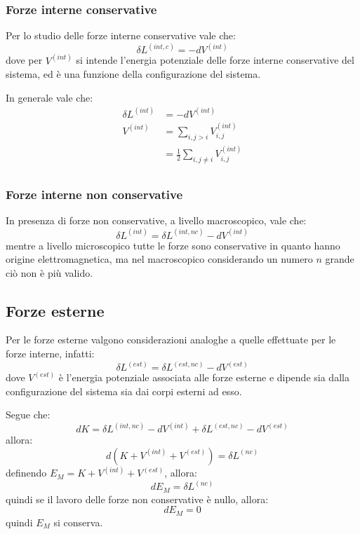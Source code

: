 \documentclass[11pt, a4paper, openright]{book}
\theoremstyle{plain}
\theoremstyle{definition}
\begin{document}
\subsubsection{Forze interne conservative}
Per lo studio delle forze interne conservative vale che:
\begin{equation}
    \delta L^{(int, c)} = -dV^{(int)}
\end{equation}
dove per $V^{(int)}$ si intende l'energia potenziale delle forze interne conservative del sistema, ed è una funzione della configurazione del sistema.

In generale vale che:
\begin{align}
    \delta L^{(int)} & = -dV^{(int)} \\
    V^{(int)} & = \sum_{i, j > i} V_{i, j}^{(int)} \\
              & = \frac{1}{2}\sum_{i, j \not = i} V_{i, j}^{(int)} \\
\end{align}

\subsubsection{Forze interne non conservative}
In presenza di forze non conservative, a livello macroscopico, vale che:
\begin{equation}
    \delta L^{(int)} = \delta L^{(int, nc)} -dV^{(int)} 
\end{equation}
mentre a livello microscopico tutte le forze sono conservative in quanto hanno origine elettromagnetica, ma nel macroscopico considerando un numero $n$ grande ciò non è più valido.

\subsection{Forze esterne}
Per le forze esterne valgono considerazioni analoghe a quelle effettuate per le forze interne, infatti:
\begin{equation}
    \delta L^{(est)} = \delta L^{(est, nc)} - dV^{(est)}
\end{equation}
dove $V^{(est)}$ è l'energia potenziale associata alle forze esterne e dipende sia dalla configurazione del sistema sia dai corpi esterni ad esso.

Segue che:
\begin{equation}
    dK = \delta L^{(int, nc)} -dV^{(int)} + \delta L^{(est, nc)} - dV^{(est)}
\end{equation}
allora:
\begin{equation}
    d(K + V^{(int)} + V^{(est)}) = \delta L^{(nc)}
\end{equation}
definendo $E_M = K + V^{(int)} + V^{(est)}$, allora:
\begin{equation}
    dE_M = \delta L^{(nc)}
\end{equation}
quindi se il lavoro delle forze non conservative è nullo, allora:
\begin{equation}
    dE_M = 0
\end{equation}
quindi $E_M$ si conserva.
\end{document}

